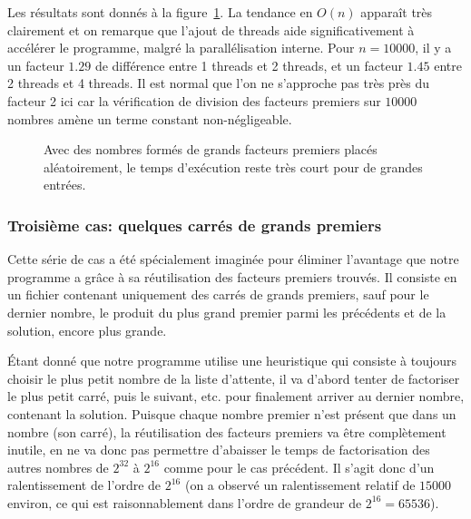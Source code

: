 \documentclass[a4paper,10pt]{article}
\begin{document}
Les résultats sont donnés à la figure~\ref{fig:large-primes}. La tendance en $O(n)$ apparaît très clairement et on remarque que l'ajout de threads aide significativement à accélérer le programme, malgré la parallélisation interne. Pour $n=10000$, il y a un facteur $1.29$ de différence entre 1 threads et 2 threads, et un facteur $1.45$ entre 2 threads et 4 threads. Il est normal que l'on ne s'approche pas très près du facteur 2 ici car la vérification de division des facteurs premiers sur $10000$ nombres amène un terme constant non-négligeable.

\begin{figure}[t!]
    \centering
    \caption{Avec des nombres formés de grands facteurs premiers placés aléatoirement, le temps d'exécution reste très court pour de grandes entrées.}
    \label{fig:large-primes}
\end{figure}

\newpage
\subsubsection*{Troisième cas: quelques carrés de grands premiers}

Cette série de cas a été spécialement imaginée pour éliminer l'avantage que notre programme a grâce à sa réutilisation des facteurs premiers trouvés. Il consiste en un fichier contenant uniquement des carrés de grands premiers, sauf pour le dernier nombre, le produit du plus grand premier parmi les précédents et de la solution, encore plus grande.

Étant donné que notre programme utilise une heuristique qui consiste à toujours choisir le plus petit nombre de la liste d'attente, il va d'abord tenter de factoriser le plus petit carré, puis le suivant, etc. pour finalement arriver au dernier nombre, contenant la solution. Puisque chaque nombre premier n'est présent que dans un nombre (son carré), la réutilisation des facteurs premiers va être complètement inutile, en ne va donc pas permettre d'abaisser le temps de factorisation des autres nombres de $2^{32}$ à $2^{16}$ comme pour le cas  précédent. Il s'agit donc d'un ralentissement de l'ordre de $2^{16}$ (on a observé un ralentissement relatif de $15000$ environ, ce qui est raisonnablement dans l'ordre de grandeur de $2^{16}=65536$).
\end{document}
